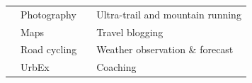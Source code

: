 \documentclass[svgnames]{article}
\begin{document}
\begin{tcolorbox}[title=\subsubsection*{Personal interests},width=.5\textwidth,arc=0mm]
\begin{tabular}{rl|rl}
\faCameraRetro	& Photography 				& \faMapSigns 	& Ultra-trail and mountain running	\\ 		
\faMapMarker 	& Maps 						& \faWordpress	&Travel blogging 					\\
\Bicycle		& Road cycling& \faCloud 	& Weather observation \& forecast					\\
\Industry    	& UrbEx 					& 							& Coaching  			\\
\end{tabular}
\end{tcolorbox}


	
\end{document}
